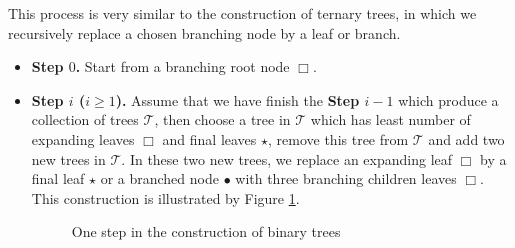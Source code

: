 This process is very similar to the construction of ternary trees, in which we recursively replace a chosen branching node by a leaf or branch.

\begin{itemize}
    \item \textbf{Step $0$.} Start from a branching root node $\Box$.
    
    \item \textbf{Step $i$ ($i\ge 1$).} Assume that we have finish the \textbf{Step $i-1$} which produce a collection of trees $\mathscr{T}$, then choose a tree in $\mathscr{T}$ which has least number of expanding leaves $\Box$ and final leaves $\star$, remove this tree from $\mathscr{T}$ and add two new trees in $\mathscr{T}$. In these two new trees, we replace an expanding leaf $\Box$ by a final leaf $\star$ or a branched node $\bullet$ with three branching children leaves $\Box$. This construction is illustrated by Figure \ref{fig.construction}.
    \begin{figure}[H]
        \centering
        \caption{One step in the construction of binary trees}
        \label{fig.construction}
        \end{figure}

\end{itemize}

